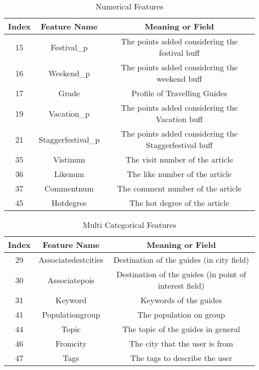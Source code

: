 \documentclass{article}
\begin{document}
	\begin{table}[!h]
		\centering
		\small{
		    \caption{Numerical Features}
			\begin{tabular}{ccc}
				\toprule
				\textbf{Index}  & \textbf{Feature Name}  &\textbf{Meaning or Field}\\ 
				\midrule
				15          & Festival\_p        & The points added considering the festival buff \\ 
				16          & Weekend\_p         & The points added considering the weekend buff \\ 
				17          & Grade              & Profile of Travelling Guides \\ 
				19          & Vacation\_p        & The points added considering the Vacation buff \\  
				21          & Staggerfestival\_p & The points added considering the Staggerfestival buff \\ 
				35          & Vistinum           & The visit number of the article \\ 
				36          & Likenum            & The like number of the article \\
				37          & Commentnum         & The comment number of the article \\
				45          & Hotdegree          & The hot degree of the article \\
			\bottomrule 
			\end{tabular}
			
			\label{ta:numf}
		}
	\end{table}
    
    \begin{table}[!h]
		\centering
		\small{
		    \caption{Multi Categorical Features}
			\begin{tabular}{ccc}
				\toprule
				\textbf{Index}  & \textbf{Feature Name}  &\textbf{Meaning or Field}\\ 
				\midrule
				29          & Associatedestcities        & Destination of the guides (in city field) \\ 
				30          & Associatepois              & Destination of the guides (in point of interest field)\\
				31          & Keyword                    & Keywords of the guides \\
				41          & Populationgroup            & The population on group \\
				44          & Topic                      & The topic of the guides in general \\
				46          & Fromcity                   & The city that the user is from \\
				47          & Tags                       & The tags to describe the user \\
			\bottomrule 
			\end{tabular}
			
			\label{ta:mcf}
		}
	\end{table}
\end{document}
